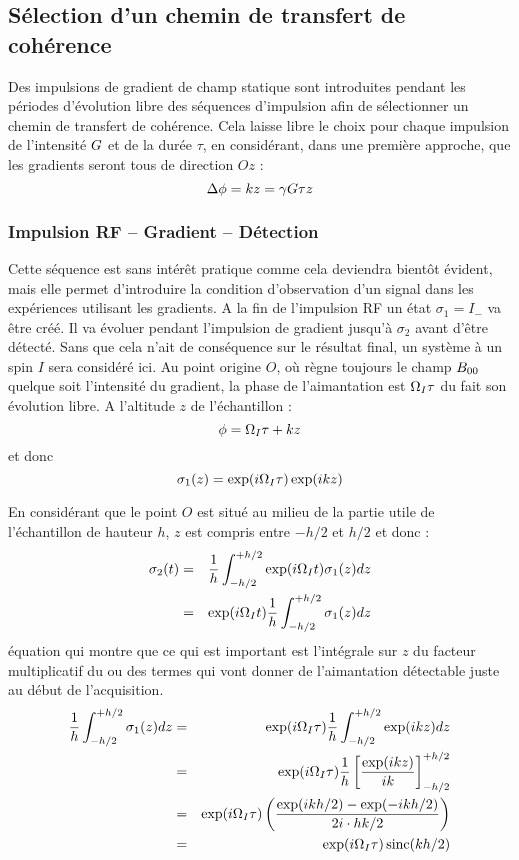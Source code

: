 \subsection{Sélection d'un chemin de transfert de cohérence}
Des impulsions de gradient de champ statique sont introduites pendant les périodes
d'évolution libre des séquences d'impulsion afin de sélectionner un chemin de
transfert de cohérence.
Cela laisse libre le choix pour chaque impulsion de l'intensité $G$ et de la durée $\tau$,
en considérant, dans une première approche, que les gradients seront tous de direction $Oz$ :
\begin{equation}
\Delta\phi = k z = \gamma G\tau z
\end{equation}

\subsubsection{Impulsion RF -- Gradient -- Détection}
Cette séquence est sans intérêt pratique comme cela deviendra bientôt évident,
mais elle permet d'introduire la condition d'observation d'un signal dans les expériences
utilisant les gradients.
A la fin de l'impulsion RF un état $\sigma_1 = I_-$ va être créé. 
Il va évoluer pendant l'impulsion de
gradient jusqu'à $\sigma_2$ avant d'être détecté.
Sans que cela n'ait de conséquence sur le résultat final, un système à un spin $I$ sera
considéré ici.
Au point origine $O$, où règne toujours le champ $B_{00}$ quelque soit l'intensité du
gradient, la phase de l'aimantation est $\Omega_I\tau$ du fait son évolution libre.
A l'altitude $z$ de l'échantillon :
\begin{equation}
\phi = \Omega_I\tau + k z
\end{equation}
et donc
\begin{equation}
\sigma_1(z) = \exp(i\Omega_I\tau)\exp(i k z)
\end{equation}

En considérant que le point $O$ est situé au milieu de la partie utile de l'échantillon
de hauteur $h$, $z$ est compris entre $-h/2$ et $h/2$ et donc :
\begin{eqnarray}
\sigma_2(t) & = & \frac{1}{h}\int_{-h/2}^{+h/2} \exp(i\Omega_I t)\sigma_1(z) dz \\
& = & \exp(i\Omega_I t) \frac{1}{h}\int_{-h/2}^{+h/2} \sigma_1(z) dz
\end{eqnarray}
équation qui montre que ce qui est important est l'intégrale sur $z$ du facteur
multiplicatif du ou des termes qui vont donner de l'aimantation détectable
juste au début de l'acquisition.
\begin{eqnarray}
\frac{1}{h}\int_{-h/2}^{+h/2} \sigma_1(z) dz & = & 
\exp(i\Omega_I\tau)\frac{1}{h}\int_{-h/2}^{+h/2}\exp(ik z) dz \\
& = & \exp(i\Omega_I\tau)\frac{1}{h}\left[\frac{\exp(ik z)}{ik}\right]_{-h/2}^{+h/2} \\
& = & \exp(i\Omega_I\tau)\left(\frac{\exp(ik h/2)-\exp(-ik h/2)}{2i\cdot hk/2}\right) \\
& = & \exp(i\Omega_I\tau)\operatorname{sinc}(k h/2)
\end{eqnarray}

